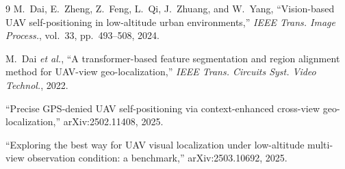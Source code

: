 \documentclass[journal]{IEEEtran}
\begin{document}
\begin{thebibliography}{9}
M.~Dai, E.~Zheng, Z.~Feng, L.~Qi, J.~Zhuang, and W.~Yang,
``Vision-based UAV self-positioning in low-altitude urban environments,''
\emph{IEEE Trans. Image Process.}, vol.~33, pp.~493--508, 2024.

M.~Dai \emph{et al.}, ``A transformer-based feature segmentation and region alignment
method for UAV-view geo-localization,'' \emph{IEEE Trans. Circuits Syst. Video Technol.},
2022.

``Precise GPS-denied UAV self-positioning via context-enhanced cross-view
geo-localization,'' arXiv:2502.11408, 2025.

``Exploring the best way for UAV visual localization under low-altitude multi-view
observation condition: a benchmark,'' arXiv:2503.10692, 2025.
\end{thebibliography}
\end{document}
